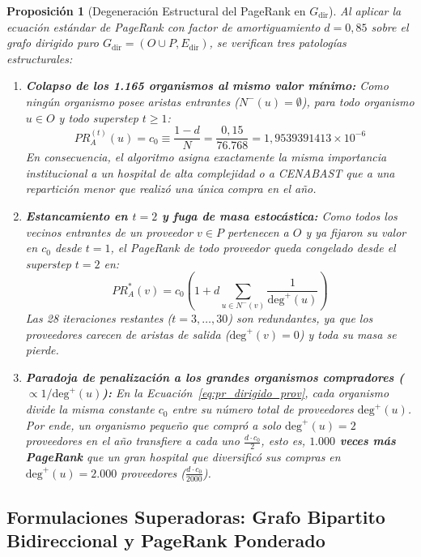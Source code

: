 \documentclass[11pt,a4paper]{article}
\newtheorem{proposition}{Proposición}
\begin{document}
\begin{proposition}[Degeneración Estructural del PageRank en $G_{\text{dir}}$]
Al aplicar la ecuación estándar de PageRank con factor de amortiguamiento $d = 0,85$ sobre el grafo dirigido puro $G_{\text{dir}} = (O \cup P, E_{\text{dir}})$, se verifican tres patologías estructurales:
\begin{enumerate}
    \item \textbf{Colapso de los 1.165 organismos al mismo valor mínimo:} Como ningún organismo posee aristas entrantes ($N^-(u) = \emptyset$), para todo organismo $u \in O$ y todo superstep $t \ge 1$:
    \begin{equation}
    PR_A^{(t)}(u) = c_0 \equiv \frac{1 - d}{N} = \frac{0,15}{76.768} = 1,9539391413 \times 10^{-6}
    \label{eq:colapso_org}
    \end{equation}
    En consecuencia, el algoritmo asigna exactamente la misma importancia institucional a un hospital de alta complejidad o a CENABAST que a una repartición menor que realizó una única compra en el año.
    \item \textbf{Estancamiento en $t = 2$ y fuga de masa estocástica:} Como todos los vecinos entrantes de un proveedor $v \in P$ pertenecen a $O$ y ya fijaron su valor en $c_0$ desde $t=1$, el PageRank de todo proveedor queda congelado desde el superstep $t = 2$ en:
    \begin{equation}
    PR_A^*(v) = c_0 \left( 1 + d \sum_{u \in N^-(v)} \frac{1}{\text{deg}^+(u)} \right)
    \label{eq:pr_dirigido_prov}
    \end{equation}
    Las 28 iteraciones restantes ($t = 3, \dots, 30$) son redundantes, ya que los proveedores carecen de aristas de salida ($\text{deg}^+(v) = 0$) y toda su masa se pierde.
    \item \textbf{Paradoja de penalización a los grandes organismos compradores ($\propto 1/\text{deg}^+(u)$):} En la Ecuación~\eqref{eq:pr_dirigido_prov}, cada organismo divide la misma constante $c_0$ entre su número total de proveedores $\text{deg}^+(u)$. Por ende, un organismo pequeño que compró a solo $\text{deg}^+(u) = 2$ proveedores en el año transfiere a cada uno $\frac{d \cdot c_0}{2}$, esto es, \textbf{$1.000$ veces más PageRank} que un gran hospital que diversificó sus compras en $\text{deg}^+(u) = 2.000$ proveedores ($\frac{d \cdot c_0}{2000}$).
\end{enumerate}
\end{proposition}

\subsection{Formulaciones Superadoras: Grafo Bipartito Bidireccional y PageRank Ponderado}
\end{document}
